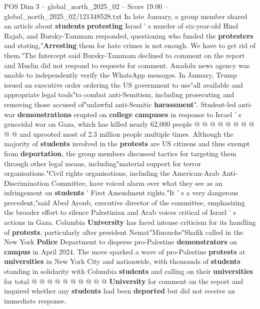 \begin{textsample}{POS Dim 3 – global\_north\_2025\_02 – Score 19.00 – global\_north\_2025\_02/121348528.txt}
In late January, a group member shared an article about \textbf{students} \textbf{protesting} Israel ' s murder of six-year-old Hind Rajab, and Bursky-Tammam responded, questioning who funded the \textbf{protesters} and stating,"\textbf{Arresting} them for hate crimes is not enough.
We have to get rid of them."The Intercept said Bursky-Tammam declined to comment on the report and Muslin did not respond to requests for comment.
Anadolu news agency was unable to independently verify the WhatsApp messages.
In January, Trump issued an executive order ordering the US government to use"all available and appropriate legal tools"to combat anti-Semitism, including prosecuting and removing those accused of"unlawful anti-Semitic \textbf{harassment}".
Student-led anti-war \textbf{demonstrations} erupted on \textbf{college} \textbf{campuses} in response to Israel ' s genocidal war on Gaza, which has killed nearly 62,000 people @ @ @ @ @ @ @ @ @ @ and uprooted most of 2.3 million people multiple times.
Although the majority of \textbf{students} involved in the \textbf{protests} are US citizens and thus exempt from \textbf{deportation}, the group members discussed tactics for targeting them through other legal means, including"material support for terror organisations."Civil rights organisations, including the American-Arab Anti-Discrimination Committee, have voiced alarm over what they see as an infringement on \textbf{students} ' First Amendment rights."It ' s a very dangerous precedent,"said Abed Ayoub, executive director of the committee, emphasizing the broader effort to silence Palestinian and Arab voices critical of Israel ' s actions in Gaza.
Columbia \textbf{University} has faced intense criticism for its handling of \textbf{protests}, particularly after president Nemat"Minouche"Shafik called in the New York \textbf{Police} Department to disperse pro-Palestine \textbf{demonstrators} on \textbf{campus} in April 2024.
The move sparked a wave of pro-Palestine \textbf{protests} at \textbf{universities} in New York City and nationwide, with thousands of \textbf{students} standing in solidarity with Columbia \textbf{students} and calling on their \textbf{universities} for total @ @ @ @ @ @ @ @ @ @ \textbf{University} for comment on the report and inquired whether any \textbf{students} had been \textbf{deported} but did not receive an immediate response.

\end{textsample}
